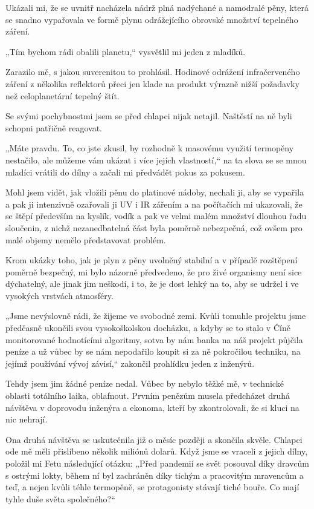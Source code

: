Ukázali mi, že se uvnitř nacházela nádrž plná nadýchané a namodralé pěny, která se snadno vypařovala ve formě plynu odrážejícího obrovské množství tepelného záření.

„Tím bychom rádi obalili planetu,“ vysvětlil mi jeden z mladíků.

Zarazilo mě, s jakou suverenitou to prohlásil. Hodinové odrážení infračerveného záření z několika reflektorů přeci jen klade na produkt výrazně nižší požadavky než celoplanetární tepelný štít. 

Se svými pochybnostmi jsem se před chlapci nijak netajil. Naštěstí na ně byli schopni patřičně reagovat.

„Máte pravdu. To, co jste zkusil, by rozhodně k masovému využití termopěny nestačilo, ale můžeme vám ukázat i více jejích vlastností,“ na ta slova se se mnou mladíci vrátili do dílny a začali mi předvádět pokus za pokusem.

Mohl jsem vidět, jak vložili pěnu do platinové nádoby, nechali ji, aby se vypařila a pak ji intenzivně ozařovali ji UV i IR zářením a na počítačích mi ukazovali, že se štěpí především na kyslík, vodík a pak ve velmi malém množství dlouhou řadu sloučenin, z nichž nezanedbatelná část byla poměrně nebezpečná, což ovšem pro malé objemy nemělo představovat problém.

Krom ukázky toho, jak je plyn z pěny uvolněný stabilní a v případě rozštěpení poměrně bezpečný, mi bylo názorně předvedeno, že pro živé organismy není sice dýchatelný, ale jinak jim neškodí, i to, že je dost lehký na to, aby se udržel i ve vysokých vrstvách atmosféry.

„Jsme nevýslovně rádi, že žijeme ve svobodné zemi. Kvůli tomuhle projektu jsme předčasně ukončili svou vysokoškolskou docházku, a kdyby se to stalo v Číně monitorované hodnotícími algoritmy, sotva by nám banka na náš projekt půjčila peníze a už vůbec by se nám nepodařilo koupit si za ně pokročilou techniku, na jejímž používání vývoj závisí,“ zakončil prohlídku jeden z inženýrů.

Tehdy jsem jim žádné peníze nedal. Vůbec by nebylo těžké mě, v technické oblasti totálního laika, oblafnout. Prvním penězům musela předcházet druhá návštěva v doprovodu inženýra a ekonoma, kteří by zkontrolovali, že si kluci na nic nehrají.

Ona druhá návštěva se uskutečnila již o měsíc později a skončila skvěle. Chlapci ode mě měli přislíbeno několik miliónů dolarů. Když jsme se vraceli z jejich dílny, položil mi Fetu následující otázku: „Před pandemií se svět posouval díky dravcům s ostrými lokty, během ní byl zachráněn díky tichým a pracovitým mravencům a teď, a nejen kvůli téhle termopěně, se protagonisty stávají tiché bouře. Co mají tyhle duše světa společného?“

